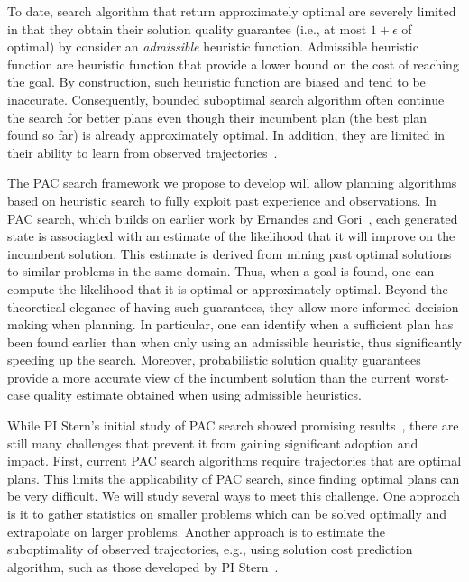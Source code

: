 \documentclass[12pt]{article}
\begin{document}
To date, search algorithm that return approximately optimal are severely limited in that they obtain their solution quality guarantee (i.e., at most $1+\epsilon$ of optimal) by consider an {\em admissible} heuristic function. Admissible heuristic function are heuristic function that provide a lower bound on the cost of reaching the goal. By construction, such heuristic function are biased and tend to be inaccurate. Consequently, bounded suboptimal search algorithm often continue the search for better plans even though their incumbent plan (the best plan found so far) is already approximately optimal. In addition, they are limited in their ability to learn from observed trajectories~\cite{ees,egraphs}.

The PAC search framework we propose to develop will allow planning algorithms based on heuristic search to fully exploit past experience and observations. In PAC search, which builds on earlier work by Ernandes and Gori~\cite{ernandes2004likely}, each generated state is associagted with an estimate of the likelihood that it will improve on the incumbent solution. This estimate is derived from mining past optimal solutions to similar problems in the same domain. Thus, when a goal is found, one can compute the likelihood that it is optimal or approximately optimal. Beyond the theoretical elegance of having such guarantees, they allow more informed decision making when planning. In particular, one can identify when a sufficient plan has been found earlier than when only using an admissible heuristic, thus significantly speeding up the search. Moreover, probabilistic solution quality guarantees 
provide a more accurate view of the incumbent solution than the current worst-case quality estimate obtained when using admissible heuristics.  



While PI Stern's initial study of PAC search showed promising results~\cite{stern2011probably,stern2012search}, there are still many challenges that prevent it from gaining significant adoption and impact. First, current PAC search algorithms require trajectories that are optimal plans. This limits the applicability of PAC search, since finding optimal plans can be very difficult. We will study several ways to meet this challenge. One approach is it to gather statistics on smaller problems which can be solved optimally and extrapolate on larger problems. Another approach is to estimate the suboptimality of observed trajectories, e.g., using solution cost prediction algorithm, such as those developed by PI Stern~\cite{}. 
\end{document}
